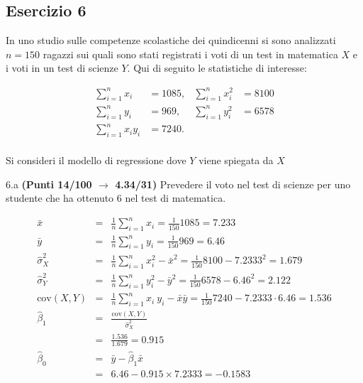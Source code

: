 \documentclass[
  11pt,
]{book}
\theoremstyle{mytheoremstyle}
\theoremstyle{mydefstyle}
\newenvironment{sol}
  {
  \begin{tcolorbox}[enhanced,breakable,arc=0.1mm,boxrule=1pt,colback=white,colframe=iblue,
  title=\bf \fontfamily{lmss}\selectfont \hspace{.5 cm} Soluzione,drop fuzzy shadow]

}{
\end{tcolorbox}
  }
\begin{document}
\subsection{Esercizio 6}\label{esercizio-6-1}

In uno studio sulle competenze scolastiche dei quindicenni si sono analizzati \(n=150\) ragazzi sui quali sono stati registrati i voti di un test in matematica \(X\) e i voti in un test di scienze \(Y\). Qui di seguito le statistiche di interesse:

\begin{align*}
\sum_{i=1}^n x_i &= 1085,   &\sum_{i=1}^n x_i^2 &= 8100 \\
\sum_{i=1}^n y_i &= 969,   &\sum_{i=1}^n y_i^2 &= 6578 \\
\sum_{i=1}^n x_iy_i &= 7240.    \\
\end{align*}

Si consideri il modello di regressione dove \(Y\) viene spiegata da \(X\)

6.a \textbf{(Punti 14/100 \(\rightarrow\) 4.34/31)} Prevedere il voto nel test di scienze per uno studente che ha ottenuto 6 nel test di matematica.

\begin{sol}
\begin{eqnarray*}
           \bar x &=&\frac 1 n\sum_{i=1}^n x_i = \frac {1}{ 150 }  1085 =  7.233 \\
           \bar y &=&\frac 1 n\sum_{i=1}^n y_i = \frac {1}{ 150 }  969 =  6.46 \\
           \hat\sigma_X^2&=&\frac 1 n\sum_{i=1}^n x_i^2-\bar x^2=\frac {1}{ 150 }  8100  - 7.2333 ^2= 1.679 \\
           \hat\sigma_Y^2&=&\frac 1 n\sum_{i=1}^n y_i^2-\bar y^2=\frac {1}{ 150 }  6578  - 6.46 ^2= 2.122 \\
           \text{cov}(X,Y)&=&\frac 1 n\sum_{i=1}^n x_i~y_i-\bar x\bar y=\frac {1}{ 150 }  7240 - 7.2333 \cdot 6.46 = 1.536 \\
           \hat\beta_1 &=& \frac{\text{cov}(X,Y)}{\hat\sigma_X^2} \\
                    &=& \frac{ 1.536 }{ 1.679 }  =  0.915 \\
           \hat\beta_0 &=& \bar y - \hat\beta_1 \bar x\\
                    &=&  6.46 - 0.915 \times  7.2333 = -0.1583 
         \end{eqnarray*}

\end{sol}
\end{document}
